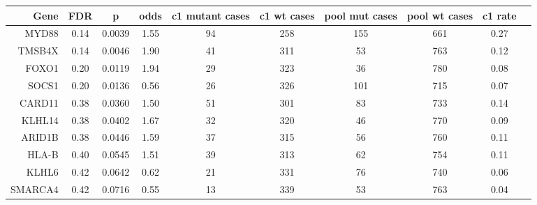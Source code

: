 \documentclass{article}
\begin{document}


\begin{table}[ht]
\begin{tabular}{rccccccccc}
  \hline
Gene & FDR & p & odds & c1 mutant cases & c1 wt cases & pool mut cases & pool wt cases & c1 rate \\
  \hline
MYD88 & 0.14 & 0.0039 & 1.55 & 94 & 258  & 155  & 661 & 0.27 \\
TMSB4X & 0.14 & 0.0046 & 1.90 & 41 & 311 & 53 & 763 & 0.12 \\
FOXO1 & 0.20 & 0.0119 & 1.94 & 29 & 323 & 36 & 780  & 0.08 \\
SOCS1 & 0.20 & 0.0136 & 0.56 & 26 & 326 & 101 & 715 & 0.07 \\
CARD11 & 0.38 & 0.0360 & 1.50 & 51 & 301 & 83 & 733 & 0.14 \\
KLHL14 & 0.38 & 0.0402 & 1.67 & 32 & 320 & 46 & 770 & 0.09 \\
ARID1B & 0.38 & 0.0446 & 1.59 & 37 & 315 & 56 & 760 & 0.11 \\
HLA-B & 0.40 & 0.0545 & 1.51 & 39 & 313 & 62 & 754 & 0.11 \\
KLHL6 & 0.42 & 0.0642 & 0.62 & 21 & 331 & 76 & 740 & 0.06 \\
SMARCA4 & 0.42 & 0.0716 & 0.55 & 13 & 339 & 53 & 763 & 0.04 \\
   \hline
\end{tabular}
\end{table}
\end{document}
